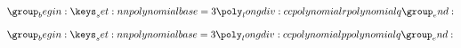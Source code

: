 \documentclass{article}
\begin{document}


\[
  \PolyLongDiv[base=3]{r}{q}
  \]

\[
  \PolyLongDiv[base=3]{p}{q}
  \]
\end{document}
